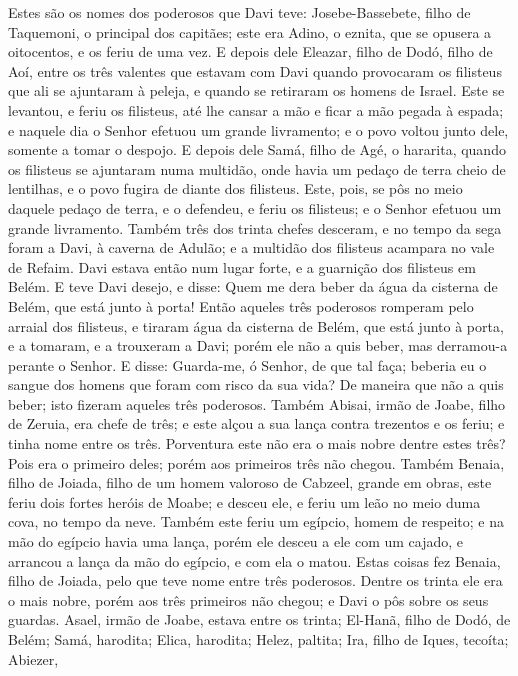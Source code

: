 Estes são os nomes dos poderosos que Davi teve: Josebe-Bassebete,
filho de Taquemoni, o principal dos capitães; este era Adino, o
eznita, que se opusera a oitocentos, e os feriu de uma vez. E
depois dele Eleazar, filho de Dodó, filho de Aoí, entre os três
valentes que estavam com Davi quando provocaram os filisteus que ali
se ajuntaram à peleja, e quando se retiraram os homens de Israel.
Este se levantou, e feriu os filisteus, até lhe cansar a mão
e ficar a mão pegada à espada; e naquele dia o Senhor efetuou um
grande livramento; e o povo voltou junto dele, somente a tomar o
despojo. E depois dele Samá, filho de Agé, o hararita, quando
os filisteus se ajuntaram numa multidão, onde havia um pedaço de
terra cheio de lentilhas, e o povo fugira de diante dos filisteus.
Este, pois, se pôs no meio daquele pedaço de terra, e o
defendeu, e feriu os filisteus; e o Senhor efetuou um grande
livramento. Também três dos trinta chefes desceram, e no
tempo da sega foram a Davi, à caverna de Adulão; e a multidão dos
filisteus acampara no vale de Refaim. Davi estava então num
lugar forte, e a guarnição dos filisteus em Belém. E teve
Davi desejo, e disse: Quem me dera beber da água da cisterna de
Belém, que está junto à porta! Então aqueles três poderosos
romperam pelo arraial dos filisteus, e tiraram água da cisterna de
Belém, que está junto à porta, e a tomaram, e a trouxeram a Davi;
porém ele não a quis beber, mas derramou-a perante o Senhor.
E disse: Guarda-me, ó Senhor, de que tal faça; beberia eu o
sangue dos homens que foram com risco da sua vida? De maneira que
não a quis beber; isto fizeram aqueles três poderosos. Também
Abisai, irmão de Joabe, filho de Zeruia, era chefe de três; e este
alçou a sua lança contra trezentos e os feriu; e tinha nome entre os
três. Porventura este não era o mais nobre dentre estes três?
Pois era o primeiro deles; porém aos primeiros três não chegou.
Também Benaia, filho de Joiada, filho de um homem valoroso de
Cabzeel, grande em obras, este feriu dois fortes heróis de Moabe; e
desceu ele, e feriu um leão no meio duma cova, no tempo da neve.
Também este feriu um egípcio, homem de respeito; e na mão do
egípcio havia uma lança, porém ele desceu a ele com um cajado, e
arrancou a lança da mão do egípcio, e com ela o matou. Estas
coisas fez Benaia, filho de Joiada, pelo que teve nome entre três
poderosos. Dentre os trinta ele era o mais nobre, porém aos
três primeiros não chegou; e Davi o pôs sobre os seus guardas.
Asael, irmão de Joabe, estava entre os trinta; El-Hanã, filho
de Dodó, de Belém; Samá, harodita; Elica, harodita;
Helez, paltita; Ira, filho de Iques, tecoíta; Abiezer,
